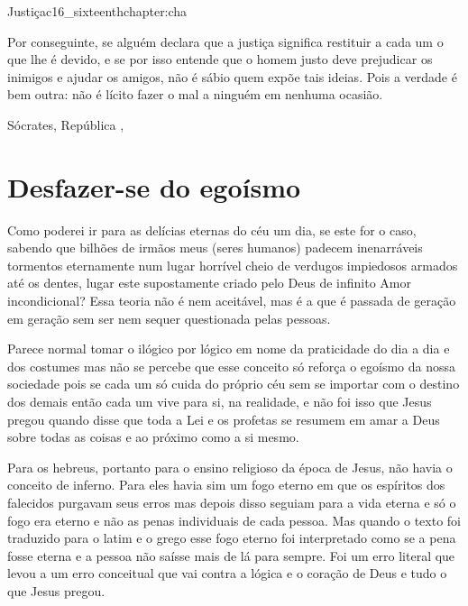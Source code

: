 \begin{chapterpage}{Justiça}{c16_sixteenthchapter:cha}

\begin{myquotation}Por conseguinte, se alguém declara que a justiça significa restituir a cada um o que lhe é devido, e se por isso entende que o homem justo deve prejudicar os inimigos e ajudar os amigos, não é sábio quem expõe tais ideias. Pois a verdade é bem outra: não é lícito fazer o mal a ninguém em nenhuma ocasião.
 
\par\vspace*{15mm}
\mbox{}\hfill \emdash{}Sócrates, República 
, %
\par\end{myquotation}

\end{chapterpage}



\section{Desfazer-se do egoísmo}\label{c1_basicformatting:sec}

\emdash{}Como poderei ir para as delícias eternas do céu um dia, se este for o caso, sabendo que bilhões de irmãos meus (seres humanos) padecem inenarráveis tormentos eternamente num lugar horrível cheio de verdugos impiedosos armados até os dentes, lugar este supostamente criado pelo Deus de infinito Amor incondicional? Essa teoria não é nem aceitável, mas é a que é passada de geração em geração sem ser nem sequer questionada pelas pessoas.

\emdash{}Parece normal tomar o ilógico por lógico em nome da praticidade do dia a dia e dos costumes mas não se percebe que esse conceito só reforça o egoísmo da nossa sociedade pois se cada um só cuida do próprio céu sem se importar com o destino dos demais então cada um vive para si, na realidade, e não foi isso que Jesus pregou quando disse que toda a Lei e os profetas se resumem em amar a Deus sobre todas as coisas e ao próximo como a si mesmo.

\emdash{}Para os hebreus, portanto para o ensino religioso da época de Jesus, não havia o conceito de inferno. Para eles havia sim um fogo eterno em que os espíritos dos falecidos purgavam seus erros mas depois disso seguiam para a vida eterna e só o fogo era eterno e não as penas individuais de cada pessoa. Mas quando o texto foi traduzido para o latim e o grego esse fogo eterno foi interpretado como se a pena fosse eterna e a pessoa não saísse mais de lá para sempre. Foi um erro literal que levou a um erro conceitual que vai contra a lógica e o coração de Deus e tudo o que Jesus pregou.

